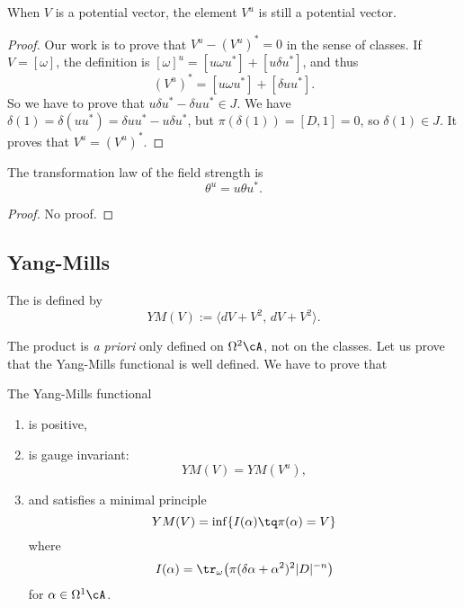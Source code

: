 \begin{lemma}
	When $V$ is a potential vector, the element $V^{u}$ is still a potential vector.
\end{lemma}

\begin{proof}
	Our work is to prove that $V^{u}-(V^{u})^*=0$ in the sense of classes. If $V=[\omega]$, the definition is $[\omega]^{u}=[u\omega u^*]+[u\delta u^*]$, and thus
	\[
		(V^{u})^*=[u\omega u^*]+[\delta uu^*].
	\]
	So we have to prove that $u\delta u^*-\delta uu^*\in J$. We have $\delta(1)=\delta(uu^*)=\delta uu^*-u\delta u^*$, but $\pi(\delta(1))=[D,1]=0$, so $\delta(1)\in J$. It proves that $V^{u}=(V^{u})^*$.
\end{proof}

\begin{lemma}
	The transformation law of the field strength is
	\begin{equation}
		\theta^{u}=u\theta u^*.
		\label{LemTrFieldStrm}
	\end{equation}

\end{lemma}
\begin{proof}
	No proof.
\end{proof}

\subsection{Yang-Mills}

The  is defined by
\begin{equation}
	YM(V):=\langle dV+V^{2},\,dV+V^{2}\rangle.
\end{equation}

The product is \emph{a priori} only defined on $\Omega^2\cA$, not on the classes. Let us prove that the Yang-Mills functional is well defined. We have to prove that

\begin{theorem}
	The Yang-Mills functional
	\begin{enumerate}
		\item is positive,
		\item is gauge invariant:
		      \begin{equation}
			      YM(V)=YM(V^{u}),
		      \end{equation}
		\item and satisfies a minimal principle
		      \begin{equation}
			      YM(V)=\inf\{ I(\alpha)\tq \pi(\alpha)=V \}
		      \end{equation}
		      where
		      \[
			      I(\alpha)=\tr_{\omega}\big( \pi(\delta\alpha+\alpha^{2})^{2}|D|^{-n} \big)
		      \]
		      for $\alpha\in\Omega^1\cA$.
	\end{enumerate}

\end{theorem}

